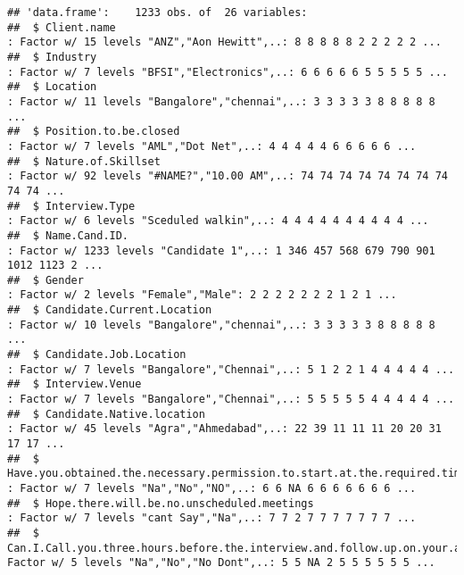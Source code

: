 \documentclass[]{article}
\begin{document}
\begin{verbatim}
## 'data.frame':    1233 obs. of  26 variables:
##  $ Client.name                                                                                       : Factor w/ 15 levels "ANZ","Aon Hewitt",..: 8 8 8 8 8 2 2 2 2 2 ...
##  $ Industry                                                                                          : Factor w/ 7 levels "BFSI","Electronics",..: 6 6 6 6 6 5 5 5 5 5 ...
##  $ Location                                                                                          : Factor w/ 11 levels "Bangalore","chennai",..: 3 3 3 3 3 8 8 8 8 8 ...
##  $ Position.to.be.closed                                                                             : Factor w/ 7 levels "AML","Dot Net",..: 4 4 4 4 4 6 6 6 6 6 ...
##  $ Nature.of.Skillset                                                                                : Factor w/ 92 levels "#NAME?","10.00 AM",..: 74 74 74 74 74 74 74 74 74 74 ...
##  $ Interview.Type                                                                                    : Factor w/ 6 levels "Sceduled walkin",..: 4 4 4 4 4 4 4 4 4 4 ...
##  $ Name.Cand.ID.                                                                                     : Factor w/ 1233 levels "Candidate 1",..: 1 346 457 568 679 790 901 1012 1123 2 ...
##  $ Gender                                                                                            : Factor w/ 2 levels "Female","Male": 2 2 2 2 2 2 2 1 2 1 ...
##  $ Candidate.Current.Location                                                                        : Factor w/ 10 levels "Bangalore","chennai",..: 3 3 3 3 3 8 8 8 8 8 ...
##  $ Candidate.Job.Location                                                                            : Factor w/ 7 levels "Bangalore","Chennai",..: 5 1 2 2 1 4 4 4 4 4 ...
##  $ Interview.Venue                                                                                   : Factor w/ 7 levels "Bangalore","Chennai",..: 5 5 5 5 5 4 4 4 4 4 ...
##  $ Candidate.Native.location                                                                         : Factor w/ 45 levels "Agra","Ahmedabad",..: 22 39 11 11 11 20 20 31 17 17 ...
##  $ Have.you.obtained.the.necessary.permission.to.start.at.the.required.time                          : Factor w/ 7 levels "Na","No","NO",..: 6 6 NA 6 6 6 6 6 6 6 ...
##  $ Hope.there.will.be.no.unscheduled.meetings                                                        : Factor w/ 7 levels "cant Say","Na",..: 7 7 2 7 7 7 7 7 7 7 ...
##  $ Can.I.Call.you.three.hours.before.the.interview.and.follow.up.on.your.attendance.for.the.interview: Factor w/ 5 levels "Na","No","No Dont",..: 5 5 NA 2 5 5 5 5 5 5 ...

\end{verbatim}
\end{document}

